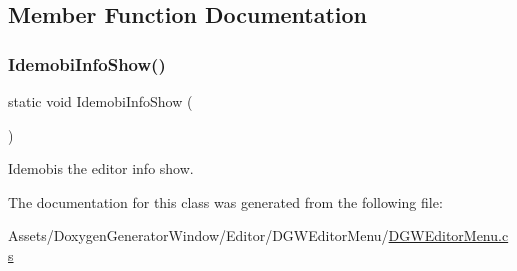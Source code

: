 \subsection{Member Function Documentation}
\mbox{\label{classDoxygenGeneratorWindow_1_1DGWEditorMenu_adb4a37ccd52035383818f3db1b9e884d}} 
\subsubsection{\texorpdfstring{Idemobi\+Info\+Show()}{IdemobiInfoShow()}}
{\footnotesize\ttfamily static void Idemobi\+Info\+Show (\begin{DoxyParamCaption}{ }\end{DoxyParamCaption})\hspace{0.3cm}{\ttfamily [static]}}



Idemobis the editor info show. 



The documentation for this class was generated from the following file\+:\begin{DoxyCompactItemize}
\item 
Assets/\+Doxygen\+Generator\+Window/\+Editor/\+D\+G\+W\+Editor\+Menu/\hyperlink{DGWEditorMenu_8cs}{D\+G\+W\+Editor\+Menu.\+cs}\end{DoxyCompactItemize}

